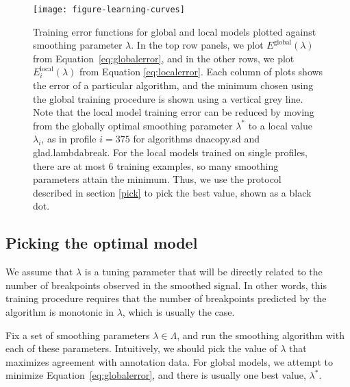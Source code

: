 \documentclass{bioinfo}
\begin{document}
\begin{methods}
\begin{figure*}
\texttt{[image: figure-learning-curves]}
\caption{\label{figure-learning-curves} Training error functions for
  global and local models plotted against smoothing parameter
  $\lambda$. In the top row panels, we plot
  $E^{\text{global}}(\lambda)$ from Equation~\ref{eq:globalerror}, and
  in the other rows, we plot $E^{\text{local}}_i(\lambda)$ from
  Equation \ref{eq:localerror}. Each column of plots shows the error
  of a particular algorithm, and the minimum chosen using the global
  training procedure is shown using a vertical grey line. Note that
  the local model training error can be reduced by moving from the
  globally optimal smoothing parameter $\lambda^*$ to a local value
  $\lambda_i$, as in profile $i=375$ for algorithms
  dnacopy.sd and glad.lambdabreak. For the local models trained on
  single profiles, there are at most 6 training examples, so many
  smoothing parameters attain the minimum. Thus, we use the protocol
  described in section \ref{pick} to pick the best value, shown as a
  black dot.}
\end{figure*}

\label{quantify}

\subsection{Picking the optimal model}

We assume that $\lambda$ is a tuning parameter that will be directly
related to the number of breakpoints observed in the smoothed
signal. In other words, this training procedure requires that the
number of breakpoints predicted by the algorithm is monotonic in
$\lambda$, which is usually the case.

Fix a set of smoothing parameters $\lambda\in\Lambda$, and run the
smoothing algorithm with each of these parameters. Intuitively, we
should pick the value of $\lambda$ that maximizes agreement with
annotation data. For global models, we attempt to minimize
Equation~\ref{eq:globalerror}, and there is usually one best value,
$\lambda^*$.


\end{methods}
\end{document}
